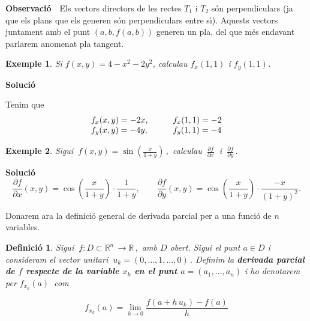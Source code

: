 \documentclass[12pt]{article}
\newcommand{\observacio}{\textbf{Observaci{\'o}}\ \ }
\newcommand{\solucio}{\textbf{Soluci{\'o}}\ \ }
\newtheorem{definicio}{Definici{\'o}}[subsection]
\newtheorem{exemple}{Exemple}[subsection]
\newcommand{\R}{\mathbb{R}}
\begin{document}
\vspace{0.4cm}
\observacio Els vectors directors de les rectes $T_{1}$ i $T_{2}$ s{\'o}n perpendiculars (ja que  els plans que els generen
s{\'o}n perpendiculars entre s{\'\i}). Aquests vectors juntament amb el
punt $(a, b, f(a,b))$  generen un pla, del que m{\'e}s endavant
parlarem anomenat pla tangent.



\vspace{0.4cm}
\begin{exemple}
Si $f(x,y)=4-x^{2}-2 y^{2}$, calculau $f_{x}(1,1)$ i $f_{y}(1,1)$.
\end{exemple}

\solucio

Tenim que
\[
\vspace{0.4cm}\begin{array}{lcl}
f_{x}(x,y)=-2x, & \quad & f_{x}(1,1) = -2 \\ f_{y}(x,y)=-4y, &
\quad & f_{y}(1,1) = -4
\end{array}
\]



\vspace{0.4cm}
\begin{exemple}
Sigui $\ f(x,y)=\sin \left(\displaystyle\frac{x}{1+y} \right)\,,$ calculau
$\ \displaystyle\frac{\partial f}{\partial x}\ $ i $\ \displaystyle\frac{\partial f}{\partial y}\,.$
\end{exemple}

\solucio
\[
\frac{\partial f}{\partial x}(x,y)=\cos\left(\frac{x}{1+y} \right)
\cdot \frac{1}{1+y}, \quad\quad \frac{\partial f}{\partial
y}(x,y)=\cos\left(\frac{x}{1+y} \right) \cdot \frac{-x}{(1+y)^{2}}.
\]

\vspace{0.4cm}
Donarem ara la definici{\'o} general de derivada parcial per a una funci{\'o} de $n$ variables.

\vspace{0.4cm}
\begin{definicio}
Sigui $\ f:D\subset\R^n\, \longrightarrow\R\,,$ amb  $D$ obert. Sigui
el punt $a\in D$ i consideram el vector unitari $\ u_k =(0,\ldots,  1,\ldots ,0)\,.$
Definim la \textbf{derivada parcial de $f$ respecte de la variable $x_k$ en el punt $a=(a_1,\ldots,a_n)$} i ho denotarem per $f_{x_k}(a)\ $ com

$$
f_{x_k}(a)=\lim_{h\to 0} \frac{f(a+h\, u_k)-f(a)}{h}
$$
\end{definicio}
\end{document}
